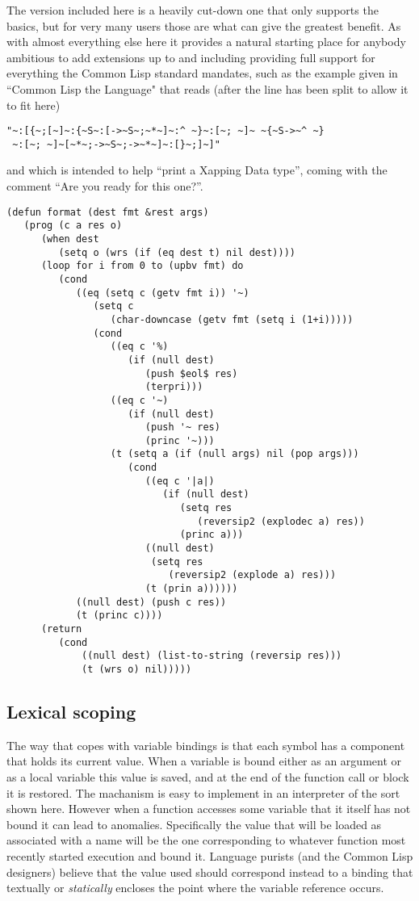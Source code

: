 The version included here is a heavily cut-down one that only supports the
basics, but for very many users those are what can give the greatest
benefit. As with almost everything else here it provides a natural starting
place for anybody ambitious to add extensions up to and including
providing full support for everything the Common Lisp standard mandates,
such as the example given in ``Common Lisp the Language" that reads (after
the line has been split to allow it to fit here)
{\small\begin{verbatim}
"~:[{~;[~]~:{~S~:[->~S~;~*~]~:^ ~}~:[~; ~]~ ~{~S->~^ ~}
 ~:[~; ~]~[~*~;->~S~;->~*~]~:[}~;]~]" 
\end{verbatim}}
and which is intended to help ``print a Xapping Data type'', coming with the
comment ``Are you ready for this one?''.

{\small\begin{verbatim}
(defun format (dest fmt &rest args)
   (prog (c a res o)
      (when dest
         (setq o (wrs (if (eq dest t) nil dest))))
      (loop for i from 0 to (upbv fmt) do
         (cond
            ((eq (setq c (getv fmt i)) '~)
               (setq c
                  (char-downcase (getv fmt (setq i (1+i)))))
               (cond
                  ((eq c '%)
                     (if (null dest)
                        (push $eol$ res)
                        (terpri)))
                  ((eq c '~)
                     (if (null dest)
                        (push '~ res)
                        (princ '~)))
                  (t (setq a (if (null args) nil (pop args)))
                     (cond
                        ((eq c '|a|)
                           (if (null dest)
                              (setq res
                                 (reversip2 (explodec a) res))
                              (princ a)))
                        ((null dest)
                         (setq res
                            (reversip2 (explode a) res)))
                        (t (prin a))))))
            ((null dest) (push c res))
            (t (princ c))))
      (return
         (cond
             ((null dest) (list-to-string (reversip res)))
             (t (wrs o) nil)))))
\end{verbatim}}
\subsection{Lexical scoping}
The way that \vsl{} copes with variable bindings is that each symbol has
a component that holds its current value. When a variable is bound either as
an argument or as a local variable this value is saved, and at the end of the
function call or block it is restored. The machanism is easy to implement in
an interpreter of the sort shown here. However when a function accesses some
variable that it itself has not bound it can lead to anomalies. Specifically
the value that will be loaded as associated with a name will be the one
corresponding to whatever function most recently started execution and
bound it. Language purists (and the Common Lisp designers) believe that
the value used should correspond instead to a binding that textually or
{\em statically} encloses the point where the variable reference occurs.

